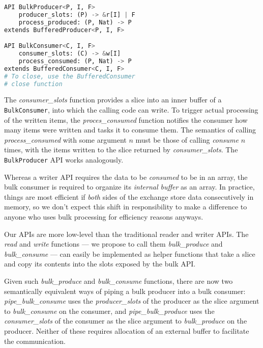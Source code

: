 \documentclass[sigplan,screen,10pt,anonymous,review]{acmart}
\begin{document}
\begin{lstlisting}[language=Python]
API BulkProducer<P, I, F>
    producer_slots: (P) -> &r[I] | F
    process_produced: (P, Nat) -> P
extends BufferedProducer<P, I, F>

API BulkConsumer<C, I, F>
    consumer_slots: (C) -> &w[I]
    process_consumed: (P, Nat) -> P
extends BufferedConsumer<C, I, F>
# To close, use the BufferedConsumer
# close function
\end{lstlisting}

The \textit{consumer\_slots} function provides a slice into an inner buffer of a \texttt{BulkConsumer}, into which the calling code can write. To trigger actual processing of the written items, the \textit{proces\_consumed} function notifies the consumer how many items were written and tasks it to consume them. The semantics of calling \textit{process\_consumed} with some argument $n$ must be those of calling \textit{consume} $n$ times, with the items written to the slice returned by \textit{consumer\_slots}. The \texttt{BulkProducer} API works analogously.

Whereas a writer API requires the data to be \textit{consumed} to be in an array, the bulk consumer is required to organize its \textit{internal buffer} as an array. In practice, things are most efficient if \textit{both} sides of the exchange store data consecutively in memory, so we don't expect this shift in responsibility to make a difference to anyone who uses bulk processing for efficiency reasons anyways.

Our APIs are more low-level than the traditional reader and writer APIs. The \textit{read} and \textit{write} functions --- we propose to call them \textit{bulk\_produce} and \textit{bulk\_consume} --- can easily be implemented as helper functions that take a slice and copy its contents into the slots exposed by the bulk API.

Given such \textit{bulk\_produce} and \textit{bulk\_consume} functions, there are now two semantically equivalent ways of piping a bulk producer into a bulk consumer: \textit{pipe\_bulk\_consume} uses the \textit{producer\_slots} of the producer as the slice argument to \textit{bulk\_consume} on the consumer, and \textit{pipe\_bulk\_produce} uses the \textit{consumer\_slots} of the consumer as the slice argument to \textit{bulk\_produce} on the producer. Neither of these requires allocation of an external buffer to facilitate the communication.
\end{document}
